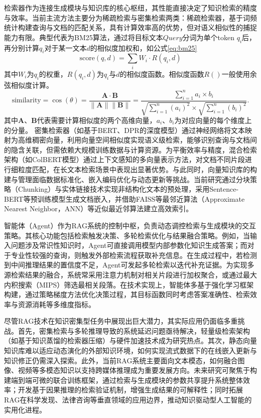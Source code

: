 检索器作为连接生成模块与知识库的核心枢纽，其性能直接决定了知识检索的精度与效率。当前主流方法主要分为稀疏检索与密集检索两类：稀疏检索器，基于词频统计构建查询与文档的匹配关系，具有计算效率高的优势，但对语义相似性的捕捉能力有限。典型代表为BM25\cite{robertsonProbabilisticRelevanceFramework2009}算法，通过将目标文本$Query$分词为单个token $q_i$后，再分别计算$q_i$对于某一文本$d$的相似度加权和，如公式\ref{eq:bm25}
\begin{equation}
  \label{eq:bm25}
  \text{score}(q, d) = \sum_{i} W_i \cdot R(q_i, d)
  \end{equation}
其中$W_i$为$q_i$的权重，$R(q_i, d)$为$q_i$与$d$的相似度函数。相似度函数$R()$一般使用余弦相似度计算。
\begin{equation}
  \text{similarity} = \cos(\theta) = \frac{\mathbf{A} \cdot \mathbf{B}}{\|\mathbf{A}\|\|\mathbf{B}\|} = \frac{\sum_{i=1}^{n} a_i \times b_i}{\sqrt{\sum_{i=1}^{n} (a_i)^2} \times \sqrt{\sum_{i=1}^{n} (b_i)^2}}.
  \end{equation}
其中$\mathbf{A}$、$\mathbf{B}$代表需要计算相似度的两个高维向量，$a_i$、$b_i$为对应向量的每个维度上的分量。
密集检索器（如基于BERT、DPR的深度模型）通过神经网络将文本映射为高维稠密向量，利用向量空间相似度实现语义级检索，能够识别查询与文档间的隐含关联，但需依赖大规模训练数据与计算资源。为平衡效率与精度，混合检索架构（如ColBERT模型）通过上下文感知的多向量表示方法，对文档不同片段进行细粒度匹配，在长文本检索场景中表现出显著优势。与此同时，向量知识库的构建与管理面临数据标准化、嵌入编码优化与动态更新等挑战。当前研究通过分块策略（Chunking）与实体链接技术实现非结构化文本的预处理，采用Sentence-BERT等预训练模型生成文档嵌入，并借助FAISS等最邻近算法（Approximate Nearest Neighbor，ANN）等近似最近邻算法建立高效索引。

智能体（Agent）作为RAG系统的控制中枢，负责动态调控检索与生成模块的交互策略。其核心功能包括检索触发决策、多轮检索优化与结果融合策略。例如，当输入问题涉及常识性知识时，Agent可直接调用模型内部参数化知识生成答案；而对于专业性较强的查询，则触发外部检索流程获取补充信息。在生成过程中，若检测到中间推理结果的置信度不足，Agent可发起多轮检索以迭代补充证据。为实现多源检索结果的融合，系统常采用注意力机制对相关片段进行加权聚合，或通过最大内积搜索（MIPS）筛选最相关段落。在技术实现上，智能体多基于强化学习框架构建，通过策略梯度方法优化决策过程，其目标函数同时考虑答案准确性、检索效率与资源消耗等多维度指标。

尽管RAG技术在知识密集型任务中展现出巨大潜力，其实际应用仍面临多重挑战。首先，密集检索与多轮推理导致的系统延迟问题亟待解决，轻量级检索架构（如基于知识蒸馏的检索器压缩）与硬件加速技术成为研究热点。其次，静态向量知识库难以适应动态演化的外部知识环境，如何实现流式数据下的在线嵌入更新与知识修正仍需深入探索。此外，当前RAG系统主要面向文本模态，如何融合图像、视频等多模态知识以支持跨媒体推理成为重要发展方向。未来研究可聚焦于构建端到端可微的联合训练框架，通过检索与生成模块的参数共享提升系统整体效率；开发基于因果推理的检索验证机制，增强生成结果的可解释性；同时拓展RAG在科学发现、法律咨询等垂直领域的应用边界，推动知识驱动型人工智能的实用化进程。
